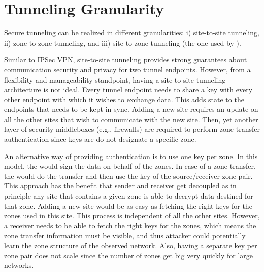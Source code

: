 \section{Tunneling Granularity} %
\label{sec:granularity}
Secure tunneling can be realized in different granularities: i) site-to-site tunneling,
ii) zone-to-zone tunneling, and iii) site-to-zone tunneling (the one used by \name).

Similar to IPSec VPN, site-to-site tunneling provides strong guarantees about communication
security and privacy for two tunnel endpoints.
However, from a flexibility and manageability standpoint, having a site-to-site tunneling
architecture is not ideal. Every tunnel endpoint needs to share a key with every other
endpoint with which it wishes to exchange data. This adds state to the endpoints that
needs to be kept in sync. Adding a new site requires an update on all the other sites that
wish to communicate with the new site. Then, yet another layer of security middleboxes (e.g., firewalls) are required to perform zone transfer authentication since keys are do not designate a specific zone.

An alternative way of providing authentication is to use one key per zone. In this model,
the \tp would sign the data on behalf of the zones. In case of a zone transfer, the \tp
would do the transfer and then use the key of the source/receiver zone pair. This approach
has the benefit that sender and receiver get decoupled as in principle any site that
contains a given zone is able to decrypt data destined for that zone. Adding a new site
would be as easy as fetching the right keys for the zones used in this site. This process
is independent of all the other sites. However, a receiver \tp needs to be able to fetch
the right keys for the zones, which means the zone transfer information must be visible,
and thus attacker could potentially learn the zone structure of the observed network.
Also, having a separate key per zone pair does not scale since the number of zones get big
very quickly for large networks.

